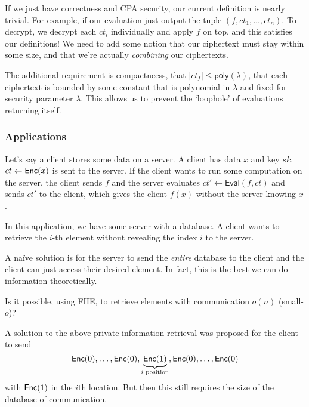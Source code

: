 If we just have correctness and CPA security, our current definition is nearly trivial. For example, if our evaluation just output the tuple $(f, ct_1, \dots, ct_n)$. To decrypt, we decrypt each $ct_i$ individually and apply $f$ on top, and this satisfies our definitions! We need to add some notion that our ciphertext must stay within some size, and that we're actually \emph{combining} our ciphertexts.

The additional requirement is \ul{compactneess}, that $|ct_f| \leq \mathsf{poly}(\lambda)$, that each ciphertext is bounded by some constant that is polynomial in $\lambda$ and fixed for security parameter $\lambda$. This allows us to prevent the `loophole' of evaluations returning itself.

\subsubsection{Applications}
\begin{example}
    Let's say a client stores some data on a server. A client has data $x$ and key $sk$. $ct\leftarrow\operatorname{\mathsf{Enc}}(x)$ is sent to the server. If the client wants to run some computation on the server, the client sends $f$ and the server evaluates $ct' \leftarrow \mathsf{Eval}(f, ct)$ and sends $ct'$ to the client, which gives the client $f(x)$ without the server knowing $x$.
\end{example}

\begin{example}
    In this application, we have some server with a database. A client wants to retrieve the $i$-th element without revealing the index $i$ to the server.


\end{example}
A na\"ive solution is for the server to send the \emph{entire} database to the client and the client can just access their desired element. In fact, this is the best we can do information-theoretically.

Is it possible, using FHE, to retrieve elements with communication $o(n)$ (small-$o$)?

A solution to the above private information retrieval was proposed for the client to send \[\operatorname{\mathsf{Enc}}(0), \dots, \operatorname{\mathsf{Enc}}(0), \underbrace{\operatorname{\mathsf{Enc}}(1)}_{i\text{ position}}, \operatorname{\mathsf{Enc}}(0), \dots, \operatorname{\mathsf{Enc}}(0)\] with $\operatorname{\mathsf{Enc}}(1)$ in the $i$th location. But then this still requires the size of the database of communication.

